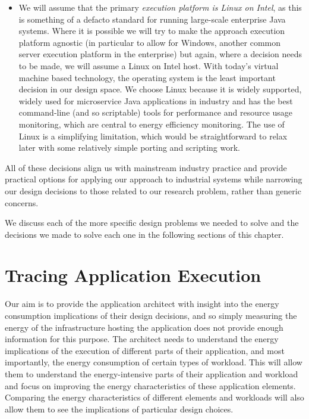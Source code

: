 \begin{itemize}
	\item We will assume that the primary \emph{execution platform is Linux on Intel}, as this is something of a defacto standard for running large-scale enterprise Java systems.  Where it is possible we will try to make the approach execution platform agnostic (in particular to allow for Windows, another common server execution platform in the enterprise) but again, where a decision needs to be made, we will assume a Linux on Intel host.  With today's virtual machine based technology, the operating system is the least important decision in our design space.  We choose Linux because it is widely supported, widely used for microservice Java applications in industry and has the best command-line (and so scriptable) tools for performance and resource usage monitoring, which are central to energy efficiency monitoring.  The use of Linux is a simplifying limitation, which would be straightforward to relax later with some relatively simple porting and scripting work.
\end{itemize}

All of these decisions align us with mainstream industry practice and provide practical options for applying our approach to industrial systems while narrowing our design decisions to those related to our research problem, rather than generic concerns.

We discuss each of the more specific design problems we needed to solve and the decisions we made to solve each one in the following sections of this chapter.

\section{Tracing Application Execution}
\label{section:tracingexecution}

Our aim is to provide the application architect with insight into the energy consumption implications of their design decisions, and so simply measuring the energy of the infrastructure hosting the application does not provide enough information for this purpose.  The architect needs to understand the energy implications of the execution of different parts of their application, and most importantly, the energy consumption of certain types of workload.  This will allow them to understand the energy-intensive parts of their application and workload and focus on improving the energy characteristics of these application elements.  Comparing the energy characteristics of different elements and workloads will also allow them to see the implications of particular design choices.

